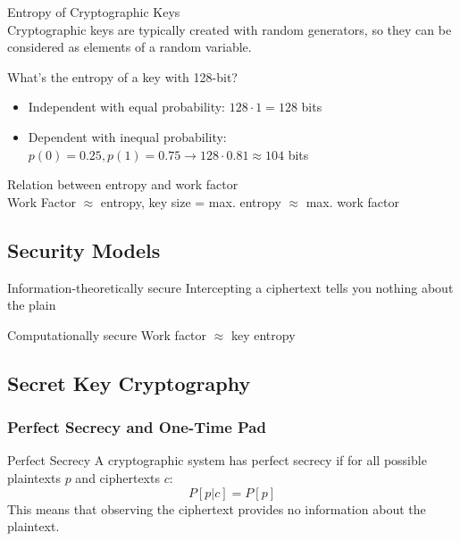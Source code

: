 \begin{concept}{Entropy of Cryptographic Keys}\\
    Cryptographic keys are typically created with random generators, so they can be considered as elements of a random variable.
    
    What's the entropy of a key with 128-bit?
    \begin{itemize}
        \item Independent with equal probability: $128 \cdot 1 = 128$ bits
        \item Dependent with inequal probability: $p(0) = 0.25, p(1) = 0.75 \rightarrow 128 \cdot 0.81 \approx 104$ bits
    \end{itemize}
\end{concept}

\begin{theorem}{Relation between entropy and work factor}\\
    Work Factor $\approx$ entropy, key size = max. entropy $\approx$ max. work factor
\end{theorem}

\subsection{Security Models}

\begin{definition}{Information-theoretically secure}
    Intercepting a ciphertext tells you nothing about the plain
\end{definition}

\begin{definition}{Computationally secure}
    Work factor $\approx$ key entropy
\end{definition}

\subsection{Secret Key Cryptography}

\subsubsection{Perfect Secrecy and One-Time Pad}

\begin{theorem}{Perfect Secrecy}
    A cryptographic system has perfect secrecy if for all possible plaintexts $p$ and ciphertexts $c$:
    \begin{equation}
        P[p|c] = P[p]
    \end{equation}
    This means that observing the ciphertext provides no information about the plaintext.
\end{theorem}

